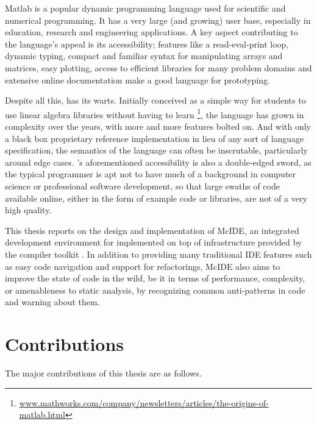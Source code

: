 {\sc Matlab}\textsuperscript{\textregistered} is a popular dynamic programming
language used for scientific and numerical programming. It has a very large
(and growing) user base, especially in education, research and engineering
applications. A key aspect contributing to the language's appeal is its
accessibility; features like a read-eval-print loop, dynamic typing, compact
and familiar syntax for manipulating arrays and matrices, easy plotting, access
to efficient libraries for many problem domains and extensive online
documentation make \matlab a good language for prototyping.

Despite all this, \matlab has its warts. Initially conceived as a simple way
for students to use \fortran linear algebra libraries without having to learn
\fortran\footnote{\url{www.mathworks.com/company/newsletters/articles/the-origins-of-matlab.html}},
the language has grown in complexity over the years, with more and more
features bolted on. And with only a black box proprietary reference
implementation in lieu of any sort of language specification, the semantics of
the language can often be inscrutable, particularly around edge cases.
\matlab's aforementioned accessibility is also a double-edged sword, as the
typical \matlab programmer is apt not to have much of a background in computer
science or professional software development, so that large swaths of \matlab
code available online, either in the form of example code or libraries, are not
of a very high quality.

This thesis reports on the design and implementation of McIDE, an integrated
development environment for \matlab implemented on top of infrastructure
provided by the \mclab compiler toolkit \cite{McLab}. In addition to providing
many traditional IDE features such as easy code navigation and support for
refactorings, McIDE also aims to improve the state of \matlab code in the wild,
be it in terms of performance, complexity, or amenableness to static analysis,
by recognizing common anti-patterns in \matlab code and warning about them.

\section{Contributions}

The major contributions of this thesis are as follows.

